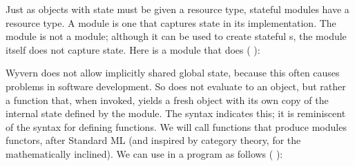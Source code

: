 \documentclass{article}
\begin{document}
\begin{mdP}[data-line={323}]%
{}Just as objects with state must be given a resource type, stateful
modules have a resource type.  A %
{}%
{} module is one that captures
state in its implementation.  The %
{}%
{} module is not a %
{}%
{}
module; although it can be used to create stateful %
{}%
{}s, the module
itself does not capture state.  Here is a module that does (%
{}%
{}):%
\end{mdP}%
\begin{mdPre}[class={para-block,pre-indented},data-line={329}]%
%
\end{mdPre}%
\begin{mdP}[data-line={336}]%
{}Wyvern does not allow implicitly shared global state, because this
often causes problems in software development.  So %
{}%
{} does
not evaluate to an object, but rather a function that, when invoked,
yields a fresh object with its own copy of the internal state defined
by the module.  The %
{}%
{} syntax indicates this; it is reminiscent
of the %
{}%
{} syntax for defining functions.  We will call functions that
produce modules functors, after Standard ML (and inspired by category
theory, for the mathematically inclined).  We can use %
{}%
{} in
a program as follows (%
{}%
{}):%
\end{mdP}%
\end{document}
